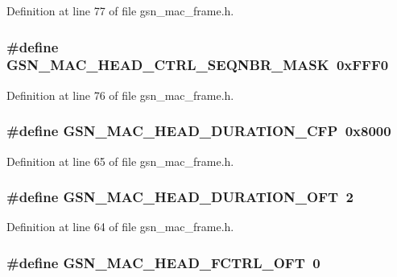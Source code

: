 Definition at line 77 of file gsn\_\-mac\_\-frame.h.

\hypertarget{a00523_aa1da0a807cc6c80b8bd5daa3672bb4a6}{
\subsubsection[{GSN\_\-MAC\_\-HEAD\_\-CTRL\_\-SEQNBR\_\-MASK}]{\setlength{\rightskip}{0pt plus 5cm}\#define GSN\_\-MAC\_\-HEAD\_\-CTRL\_\-SEQNBR\_\-MASK~0xFFF0}}
\label{a00523_aa1da0a807cc6c80b8bd5daa3672bb4a6}


Definition at line 76 of file gsn\_\-mac\_\-frame.h.

\hypertarget{a00523_afbd7ba83614e150e4e06a75e778e890a}{
\subsubsection[{GSN\_\-MAC\_\-HEAD\_\-DURATION\_\-CFP}]{\setlength{\rightskip}{0pt plus 5cm}\#define GSN\_\-MAC\_\-HEAD\_\-DURATION\_\-CFP~0x8000}}
\label{a00523_afbd7ba83614e150e4e06a75e778e890a}


Definition at line 65 of file gsn\_\-mac\_\-frame.h.

\hypertarget{a00523_a9283959c1983273aee5c97cd8fb4d5ab}{
\subsubsection[{GSN\_\-MAC\_\-HEAD\_\-DURATION\_\-OFT}]{\setlength{\rightskip}{0pt plus 5cm}\#define GSN\_\-MAC\_\-HEAD\_\-DURATION\_\-OFT~2}}
\label{a00523_a9283959c1983273aee5c97cd8fb4d5ab}


Definition at line 64 of file gsn\_\-mac\_\-frame.h.

\hypertarget{a00523_a1ef5f080a6f0f988d53b1c834c603047}{
\subsubsection[{GSN\_\-MAC\_\-HEAD\_\-FCTRL\_\-OFT}]{\setlength{\rightskip}{0pt plus 5cm}\#define GSN\_\-MAC\_\-HEAD\_\-FCTRL\_\-OFT~0}}
\label{a00523_a1ef5f080a6f0f988d53b1c834c603047}



